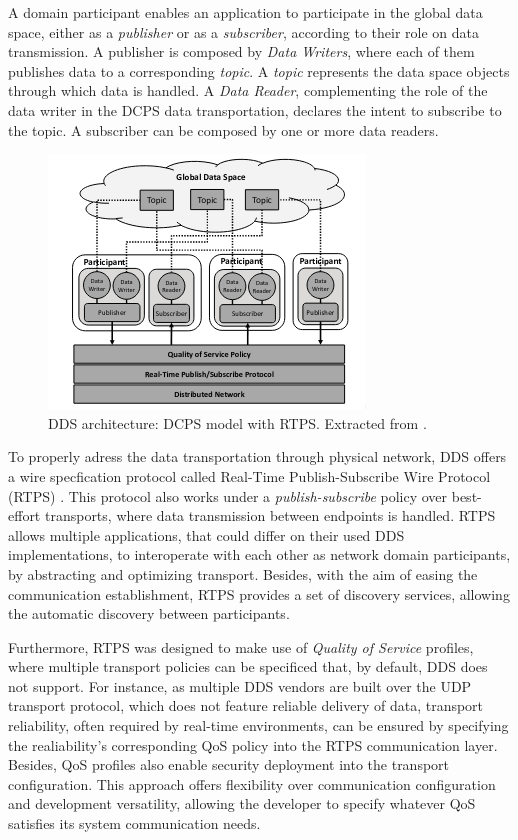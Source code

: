 A domain participant enables an application to participate in the global data space, either as a \textit{publisher} or as a \textit{subscriber}, according to their role on data transmission. A publisher is composed by \textit{Data Writers}, where each of them publishes data to a corresponding \textit{topic}. A \textit{topic} represents the data space objects through which data is handled. A \textit{Data Reader}, complementing the role of the data writer in the DCPS data transportation, declares the intent to subscribe to the topic. A subscriber can be composed by one or more data readers. \cite{alaerjan2017modeling, dcps-rtps}

\begin{figure}[H]
    \centering
    \includegraphics[width=0.5\linewidth]{images/dcps-model.png}
    \caption{DDS architecture: DCPS model with RTPS. Extracted from \cite{maruyama2016exploring}.}
    \label{fig:dcps-model}
\end{figure}

To properly adress the data transportation through physical network, DDS offers a wire specfication protocol called Real-Time Publish-Subscribe Wire Protocol (RTPS) \cite{rtps}. This protocol also works under a \textit{publish-subscribe} policy over best-effort transports, where data transmission between endpoints is handled. \cite{yun2017data} RTPS allows multiple applications, that could differ on their used DDS implementations, to interoperate with each other as network domain participants, by abstracting and optimizing transport. \cite{dcps-rtps, alaerjan2017modeling} Besides, with the aim of easing the communication establishment, RTPS provides a set of discovery services, allowing the automatic discovery between participants. \cite{dcps-rtps}

Furthermore, RTPS was designed to make use of \textit{Quality of Service} profiles, where multiple transport policies can be specificed that, by default, DDS does not support. For instance, as multiple DDS vendors are built over the UDP \cite{udp} transport protocol, which does not feature reliable delivery of data, transport reliability, often required by real-time environments, can be ensured by specifying the realiability's corresponding QoS policy into the RTPS communication layer. Besides, QoS profiles also enable security deployment into the transport configuration. This approach offers flexibility over communication configuration and development versatility, allowing the developer to specify whatever QoS satisfies its system communication needs. \cite{diluoffo2018robot, maruyama2016exploring}


